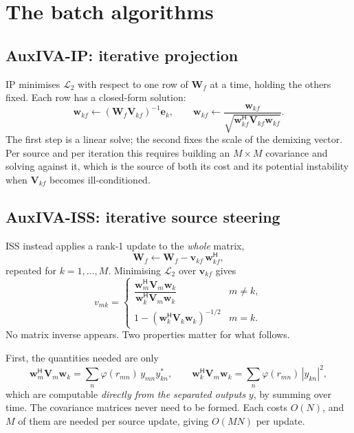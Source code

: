 \documentclass[11pt,a4paper]{article}
\newcommand{\W}{\boldsymbol{W}}
\newcommand{\V}{\boldsymbol{V}}
\newcommand{\w}{\boldsymbol{w}}
\newcommand{\vv}{\boldsymbol{v}}
\newcommand{\e}{\boldsymbol{e}}
\newcommand{\herm}{^{\mathsf{H}}}
\begin{document}
\section{The batch algorithms}

\subsection{AuxIVA-IP: iterative projection}

IP minimises $\mathcal{L}_2$ with respect to one row of $\W_f$ at a time, holding
the others fixed. Each row has a closed-form solution:
%
\begin{equation}
\w_{kf} \leftarrow (\W_f \V_{kf})^{-1}\e_k,
\qquad
\w_{kf} \leftarrow \frac{\w_{kf}}{\sqrt{\w_{kf}\herm \V_{kf} \w_{kf}}}.
\label{eq:ip}
\end{equation}
%
The first step is a linear solve; the second fixes the scale of the demixing
vector. Per source and per iteration this requires building an $M\times M$
covariance and solving against it, which is the source of both its cost and its
potential instability when $\V_{kf}$ becomes ill-conditioned.

\subsection{AuxIVA-ISS: iterative source steering}

ISS instead applies a rank-1 update to the \emph{whole} matrix,
%
\begin{equation}
\W_f \leftarrow \W_f - \vv_{kf}\,\w_{kf}\herm ,
\label{eq:issupdate}
\end{equation}
%
repeated for $k = 1,\dots,M$. Minimising $\mathcal{L}_2$ over $\vv_{kf}$ gives
%
\begin{equation}
v_{mk} =
\begin{cases}
\dfrac{\w_m\herm \V_m \w_k}{\w_k\herm \V_m \w_k} & m \ne k,\\[1.1em]
1 - \left(\w_k\herm \V_k \w_k\right)^{-1/2} & m = k.
\end{cases}
\label{eq:issv}
\end{equation}
%
No matrix inverse appears. Two properties matter for what follows.

First, the quantities needed are only
%
\begin{equation}
\w_m\herm \V_m \w_k = \sum_n \varphi(r_{mn})\, y_{mn} y_{kn}^{*},
\qquad
\w_k\herm \V_m \w_k = \sum_n \varphi(r_{mn})\, |y_{kn}|^2 ,
\label{eq:issefficient}
\end{equation}
%
which are computable \emph{directly from the separated outputs} $y$, by summing
over time. The covariance matrices never need to be formed. Each costs $O(N)$,
and $M$ of them are needed per source update, giving $O(MN)$ per update.
\end{document}
